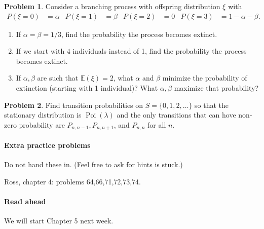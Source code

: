 \documentclass{article}
\newcommand{\E}{\mathbb E}
\DeclareMathOperator{\Poi}{Poi}
\theoremstyle{definition}
\newtheorem{problem}{Problem}
\begin{document}

\begin{problem}
  Consider a branching process with offspring distribution $\xi$ with
  \begin{align*}
    P(\xi=0) &= \alpha & 
    P(\xi=1) &= \beta & 
    P(\xi=2) &= 0 & 
    P(\xi=3) &= 1-\alpha-\beta.
  \end{align*}
  \begin{enumerate}
  \item If $\alpha=\beta=1/3$, find the probability the process becomes extinct.
  \item If we start with $4$ individuals instead of 1, find the probability the process becomes extinct.
  \item If $\alpha,\beta$ are such that $\E(\xi)=2$, what $\alpha$ and $\beta$ minimize the probability of extinction (starting with 1 individual)? What $\alpha,\beta$ maximize that probability?
  \end{enumerate}
\end{problem}


\begin{problem}
  Find transition probabilities on $S=\{0,1,2,\dots\}$ so that the stationary distribution is $\Poi(\lambda)$ and the only transitions that can hove non-zero probability are $P_{n,n-1}, P_{n,n+1}$, and $P_{n,n}$ for all $n$.
\end{problem}


\paragraph{Extra practice problems}
Do not hand these in. (Feel free to ask for hints is stuck.)

Ross, chapter 4: problems 64,66,71,72,73,74.

\paragraph{Read ahead}
We will start Chapter 5 next week.
\end{document}
